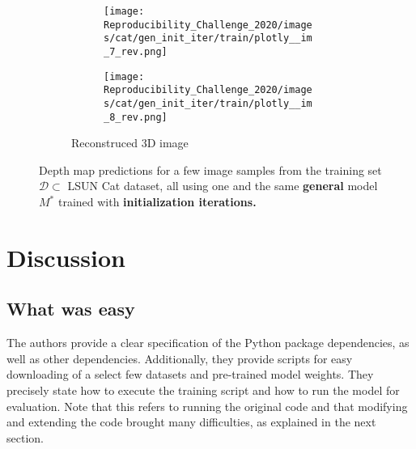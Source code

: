 \begin{figure}[!htb]
\begin{subfigure}{\textwidth}
\begin{subfigure}{0.24\textwidth}
\end{subfigure}
\begin{subfigure}{0.24\textwidth}
    \centering
    \texttt{[image: Reproducibility\_Challenge\_2020/images/cat/gen\_init\_iter/train/plotly\_\_im\_7\_rev.png]}
\end{subfigure}
\begin{subfigure}{0.24\textwidth}
    \centering
    \texttt{[image: Reproducibility\_Challenge\_2020/images/cat/gen\_init\_iter/train/plotly\_\_im\_8\_rev.png]}
    \label{}
\end{subfigure}
\caption{Reconstruced 3D image}
\end{subfigure}
    \caption{Depth map predictions for a few image samples from the training set $\mathcal{D} \subset$ LSUN Cat dataset, all using one and the same \textbf{general} model $M^*$ trained with \textbf{initialization iterations.}}
    \label{fig:init_iter_general}
\end{figure}
\section{Discussion}


\subsection{What was easy}

The authors provide a clear specification of the Python package dependencies, as well as other dependencies. Additionally, they provide scripts for easy downloading of a select few datasets and pre-trained model weights. They precisely state how to execute the training script and how to run the model for evaluation. Note that this refers to running the original code and that modifying and extending the code brought many difficulties, as explained in the next section.

